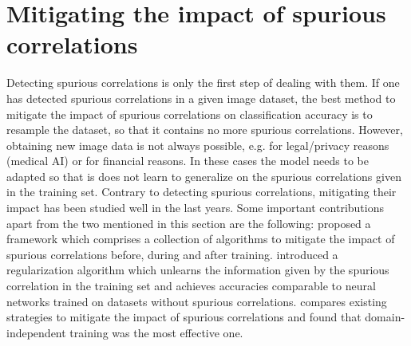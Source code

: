 \documentclass{article}
\begin{document}
\section{Mitigating the impact of spurious correlations}
\label{sec:mitigatingscs}
Detecting spurious correlations is only the first step of dealing with them. If one has detected
spurious correlations in a given image dataset, the best method to mitigate the impact of spurious correlations
on classification accuracy is to resample the dataset, so that it contains no more spurious correlations.
However, obtaining new image data is not always possible, e.g. for legal/privacy reasons (medical AI) or for
financial reasons. In these cases the model needs to be adapted so that is does not learn to generalize on the
spurious correlations given in the training set. Contrary to detecting spurious correlations, mitigating their
impact has been studied well in the last years. Some important contributions apart from the two mentioned in
this section are the following: \cite{bellamy2018ai} proposed a framework which comprises a collection of algorithms
to mitigate the impact of spurious correlations before, during and after training. \cite{Kim_2019_CVPR} introduced a 
regularization algorithm which unlearns the information given by the spurious correlation in the training set and achieves accuracies
comparable to neural networks trained on datasets without spurious correlations. \cite{Wang_2020_CVPR} compares existing strategies
to mitigate the impact of spurious correlations and found that domain-independent training was the most effective one.
\end{document}
